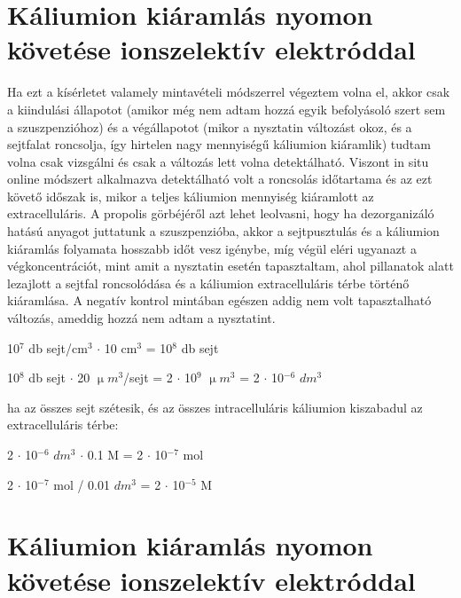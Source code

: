 \section{Káliumion kiáramlás nyomon követése ionszelektív elektróddal}
Ha ezt a kísérletet valamely mintavételi módszerrel végeztem volna el, akkor csak a kiindulási állapotot (amikor még nem adtam hozzá egyik befolyásoló szert sem a szuszpenzióhoz) és a végállapotot (mikor a nysztatin változást okoz, és a sejtfalat roncsolja, így hirtelen nagy mennyiségű káliumion kiáramlik) tudtam volna csak vizsgálni és csak a változás lett volna detektálható. Viszont in situ online módszert alkalmazva detektálható volt a roncsolás időtartama és az ezt követő időszak is, mikor a teljes káliumion mennyiség kiáramlott az extracelluláris. A propolis görbéjéről azt lehet leolvasni, hogy ha dezorganizáló hatású anyagot juttatunk a szuszpenzióba, akkor a sejtpusztulás és a káliumion kiáramlás folyamata hosszabb időt vesz igénybe, míg végül eléri ugyanazt a végkoncentrációt, mint amit a nysztatin esetén tapasztaltam, ahol pillanatok alatt lezajlott a sejtfal roncsolódása és a káliumion extracelluláris térbe történő kiáramlása. A negatív kontrol mintában egészen addig nem volt tapasztalható változás, ameddig hozzá nem adtam a nysztatint. 




10$^7$ db sejt/cm$^3$ $\cdot$ 10 cm$^3$ = 10$^8$ db sejt

10$^8$ db sejt $\cdot$ 20 $\upmu m^3$/sejt = 2 $\cdot$ 10$^9$ $\upmu m^3$ = 2 $\cdot$ 10$^{-6}$ $dm^3$

ha az összes sejt szétesik, és az összes intracelluláris káliumion kiszabadul az extracelluláris térbe:

2 $\cdot$ 10$^{-6}$ $dm^3$ $\cdot$ 0.1 M = 2 $\cdot$ 10$^{-7}$ mol

2 $\cdot$ 10$^{-7}$ mol / 0.01 $dm^3$ = 2 $\cdot$ 10$^{-5}$ M


\section{Káliumion kiáramlás nyomon követése ionszelektív elektróddal}

